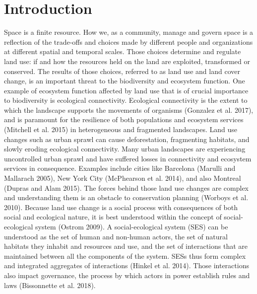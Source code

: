 \section{Introduction}
Space is a finite resource. How we, as a community, manage and govern space is a reflection of the trade-offs and choices made by different people and organizations at different spatial and temporal scales. Those choices determine and regulate land use: if and how the resources held on the land are exploited, transformed or conserved.  The results of those choices, referred to as land use and land cover change, is an important threat to the biodiversity and ecosystem function.
One example of ecosystem function affected by land use that is of crucial importance to biodiversity is ecological connectivity. Ecological connectivity is the extent to which the landscape supports the movements of organisms (Gonzalez et al. 2017), and is paramount for the resilience of both populations and ecosystem services (Mitchell et al. 2015) in heterogeneous and fragmented landscapes. Land use changes such as urban sprawl can cause deforestation, fragmenting habitats, and slowly eroding ecological connectivity. Many urban landscapes are experiencing uncontrolled urban sprawl and have suffered losses in connectivity and ecosystem services in consequence. Examples include cities like Barcelona (Marulli and Mallarach 2005), New York City (McPhearson et al. 2014), and also Montreal (Dupras and Alam 2015).  The forces behind those land use changes are complex and understanding them is an obstacle to conservation planning  (Worboys et al. 2010).  Because land use change is a social process with consequences of both social and ecological nature, it is best understood within the concept of social-ecological system (Ostrom 2009). A social-ecological system (SES) can be understood as the set of human and non-human actors, the set of natural habitats they inhabit and resources and use, and the set of interactions that are maintained between all the components of the system. SESs thus form complex and integrated aggregates of interactions (Hinkel et al. 2014). Those interactions also impact governance, the process by which actors in power establish rules and laws (Bissonnette et al. 2018).
